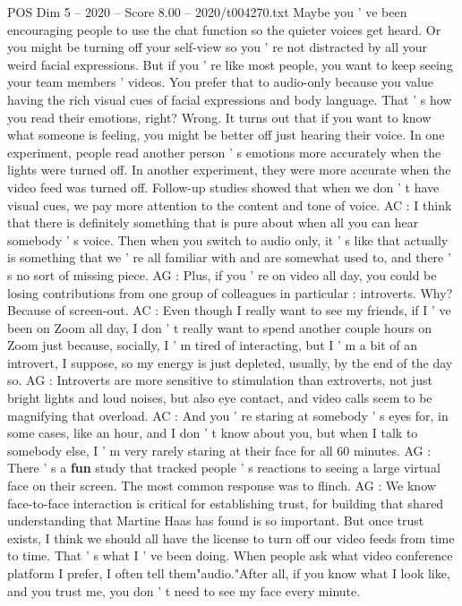 \begin{textsample}{POS Dim 5 – 2020 – Score 8.00 – 2020/t004270.txt}
Maybe you ' ve been encouraging people to use the chat function so the quieter voices get heard.
Or you might be turning off your self-view so you ' re not distracted by all your weird facial expressions.
But if you ' re like most people, you want to keep seeing your team members ' videos.
You prefer that to audio-only because you value having the rich visual cues of facial expressions and body language.
That ' s how you read their emotions, right?
Wrong.
It turns out that if you want to know what someone is feeling, you might be better off just hearing their voice.
In one experiment, people read another person ' s emotions more accurately when the lights were turned off.
In another experiment, they were more accurate when the video feed was turned off.
Follow-up studies showed that when we don ' t have visual cues, we pay more attention to the content and tone of voice.
AC : I think that there is definitely something that is pure about when all you can hear somebody ' s voice.
Then when you switch to audio only, it ' s like that actually is something that we ' re all familiar with and are somewhat used to, and there ' s no sort of missing piece.
AG : Plus, if you ' re on video all day, you could be losing contributions from one group of colleagues in particular : introverts.
Why?
Because of screen-out.
AC : Even though I really want to see my friends, if I ' ve been on Zoom all day, I don ' t really want to spend another couple hours on Zoom just because, socially, I ' m tired of interacting, but I ' m a bit of an introvert, I suppose, so my energy is just depleted, usually, by the end of the day so.
AG : Introverts are more sensitive to stimulation than extroverts, not just bright lights and loud noises, but also eye contact, and video calls seem to be magnifying that overload.
AC : And you ' re staring at somebody ' s eyes for, in some cases, like an hour, and I don ' t know about you, but when I talk to somebody else, I ' m very rarely staring at their face for all 60 minutes.
AG : There ' s a \textbf{fun} study that tracked people ' s reactions to seeing a large virtual face on their screen.
The most common response was to flinch.
AG : We know face-to-face interaction is critical for establishing trust, for building that shared understanding that Martine Haas has found is so important.
But once trust exists, I think we should all have the license to turn off our video feeds from time to time.
That ' s what I ' ve been doing.
When people ask what video conference platform I prefer, I often tell them"audio."After all, if you know what I look like, and you trust me, you don ' t need to see my face every minute.

\end{textsample}
